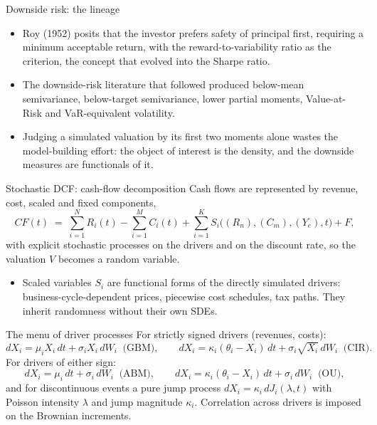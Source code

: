 \documentclass[aspectratio=169,11pt]{beamer}
\begin{document}
\begin{frame}{Downside risk: the lineage}
  \begin{itemize}
    \item Roy (1952) posits that the investor prefers safety of principal
          first, requiring a minimum acceptable return, with the
          reward-to-variability ratio as the criterion, the concept that
          evolved into the Sharpe ratio.
    \item The downside-risk literature that followed produced below-mean
          semivariance, below-target semivariance, lower partial moments,
          Value-at-Risk and VaR-equivalent volatility.
    \item Judging a simulated valuation by its first two moments alone
          wastes the model-building effort: the object of interest is the
          density, and the downside measures are functionals of it.
  \end{itemize}
\end{frame}

\begin{frame}{Stochastic DCF: cash-flow decomposition}
  \small Cash flows are represented by revenue, cost, scaled and fixed
  components,
  \[ CF(t) \;=\; \sum_{i=1}^{N} R_i(t) - \sum_{i=1}^{M} C_i(t)
     + \sum_{i=1}^{K} S_i\big((R_n),(C_m),(Y_e),t\big) + F, \]
  with explicit stochastic processes on the drivers and on the discount
  rate, so the valuation $V$ becomes a random variable.
  \begin{itemize}
    \item Scaled variables $S_i$ are functional forms of the directly
          simulated drivers: business-cycle-dependent prices, piecewise
          cost schedules, tax paths. They inherit randomness without their
          own SDEs.
  \end{itemize}
\end{frame}

\begin{frame}{The menu of driver processes}
  \small For strictly signed drivers (revenues, costs):
  \[ dX_i = \mu_i X_i\,dt + \sigma_i X_i\,dW_i \;\;\text{(GBM)},
     \qquad
     dX_i = \kappa_i(\theta_i - X_i)\,dt + \sigma_i\sqrt{X_i}\,dW_i
     \;\;\text{(CIR)}. \]
  For drivers of either sign:
  \[ dX_i = \mu_i\,dt + \sigma_i\,dW_i \;\;\text{(ABM)},
     \qquad
     dX_i = \kappa_i(\theta_i - X_i)\,dt + \sigma_i\,dW_i \;\;\text{(OU)}, \]
  and for discontinuous events a pure jump process
  $dX_i = \kappa_i\,dJ_i(\lambda,t)$ with Poisson intensity $\lambda$ and
  jump magnitude $\kappa_i$. Correlation across drivers is imposed on the
  Brownian increments.
\end{frame}
\end{document}
